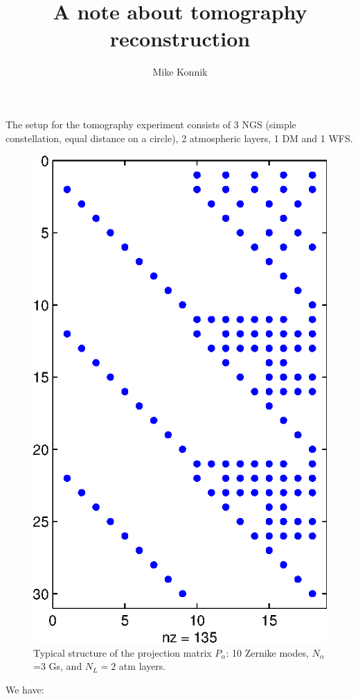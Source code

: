 \documentclass[a4paper,12pt]{article}
\title{A note about tomography reconstruction}
\author{Mike Konnik}
\begin{document}
\maketitle

The setup for the tomography experiment consists of 3 NGS (simple constellation, equal distance on a circle), 2 atmospheric layers, 1 DM and 1 WFS.  

\begin{figure} 
\vspace{-5ex}
\includegraphics[width=1\linewidth]{Projection_Matrix_spy}
\caption{Typical structure of the projection matrix $P_\alpha$: 10 Zernike modes, $N_\alpha$=3 Gs, and $N_L = 2$ atm layers.}
\label{fig:Projection_Matrix_spy}
\end{figure}     We have: 
\end{document}

